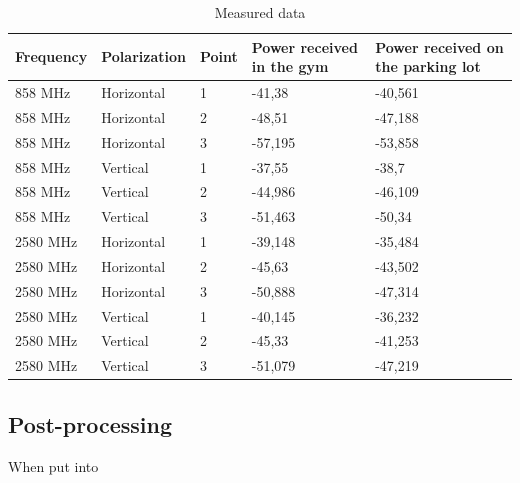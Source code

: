 \begin{table}[H]
\centering
\label{my-label}
\begin{tabular}{|l|l|l|p{3.5cm}|p{3.5cm}|}
\hline
\textbf{Frequency} & \textbf{Polarization} & \textbf{Point} & \textbf{Power received in the gym} & \textbf{Power received on the parking lot} \\ \hline
858 MHz            & Horizontal            & 1              & -41,38		& -40,561		\\ \hline
858 MHz            & Horizontal            & 2              & -48,51		& -47,188		\\ \hline
858 MHz            & Horizontal            & 3              & -57,195 		& -53,858		\\ \hline
858 MHz            & Vertical              & 1              & -37,55 		& -38,7			\\ \hline
858 MHz            & Vertical              & 2              & -44,986		& -46,109		\\ \hline
858 MHz            & Vertical              & 3              & -51,463		& -50,34		\\ \hline
2580 MHz           & Horizontal            & 1              & -39,148		& -35,484		\\ \hline
2580 MHz           & Horizontal            & 2              & -45,63		& -43,502		\\ \hline
2580 MHz           & Horizontal            & 3              & -50,888		& -47,314		\\ \hline
2580 MHz           & Vertical              & 1              & -40,145		& -36,232		\\ \hline
2580 MHz           & Vertical              & 2              & -45,33		& -41,253		\\ \hline
2580 MHz           & Vertical              & 3              & -51,079		& -47,219		\\ \hline
\end{tabular}
\caption{Measured data}
\label{tab:data}
\end{table}

\subsection{Post-processing}
When put into 

\begin{equation}

\end{equation}